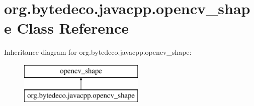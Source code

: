 \hypertarget{classorg_1_1bytedeco_1_1javacpp_1_1opencv__shape}{}\section{org.\+bytedeco.\+javacpp.\+opencv\+\_\+shape Class Reference}
\label{classorg_1_1bytedeco_1_1javacpp_1_1opencv__shape}
Inheritance diagram for org.\+bytedeco.\+javacpp.\+opencv\+\_\+shape\+:\begin{figure}[H]
\begin{center}
\leavevmode
\includegraphics[height=2.000000cm]{classorg_1_1bytedeco_1_1javacpp_1_1opencv__shape}
\end{center}
\end{figure}
